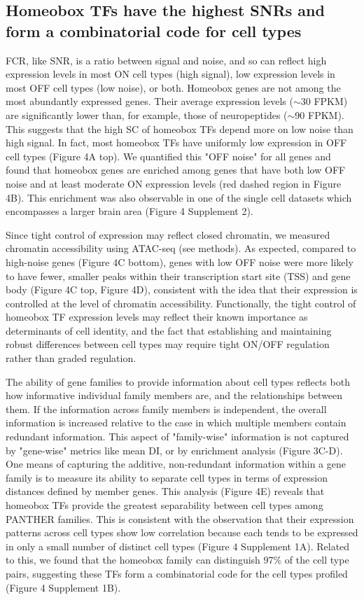 \subsection{Homeobox TFs have the highest SNRs and form a combinatorial code for cell types}
FCR, like SNR, is a ratio between signal and noise, and so can reflect high expression levels in most ON cell types (high signal), low expression levels in most OFF cell types (low noise), or both. Homeobox genes are not among the most abundantly expressed genes. Their average expression levels ($\sim$30 FPKM) are significantly lower than, for example, those of neuropeptides ($\sim$90 FPKM). This suggests that the high SC of homeobox TFs depend more on low noise than high signal. In fact, most homeobox TFs have uniformly low expression in OFF cell types (Figure 4A top). We quantified this "OFF noise" for all genes and found that homeobox genes are enriched among genes that have both low OFF noise and at least moderate ON expression levels (red dashed region in Figure 4B). This enrichment was also observable in one of the single cell datasets which encompasses a larger brain area (Figure 4 Supplement 2). 

Since tight control of expression may reflect closed chromatin, we measured chromatin accessibility using ATAC-seq (see methods). As expected, compared to high-noise genes (Figure 4C bottom), genes with low OFF noise were more likely to have fewer, smaller peaks within their transcription start site (TSS) and gene body (Figure 4C top, Figure 4D), consistent with the idea that their expression is controlled at the level of chromatin accessibility. Functionally, the tight control of homeobox TF expression levels may reflect their known importance as determinants of cell identity, and the fact that establishing and maintaining robust differences between cell types may require tight ON/OFF regulation rather than graded regulation.

The ability of gene families to provide information about cell types reflects both how informative individual family members are, and the relationships between them. If the information across family members is independent, the overall information is increased relative to the case in which multiple members contain redundant information. This aspect of "family-wise" information is not captured by "gene-wise" metrics like mean DI, or by enrichment analysis (Figure 3C-D). One means of capturing the additive, non-redundant information within a gene family is to measure its ability to separate cell types in terms of expression distances defined by member genes. This analysis (Figure 4E) reveals that homeobox TFs provide the greatest separability between cell types among PANTHER families. This is consistent with the observation that their expression patterns across cell types show low correlation because each tends to be expressed in only a small number of distinct cell types (Figure 4 Supplement 1A). Related to this, we found that the homeobox family can distinguish 97\% of the cell type pairs, suggesting these TFs form a combinatorial code for the cell types profiled (Figure 4 Supplement 1B). 

